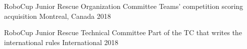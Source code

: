 
\begin{cvhonors}
\begin{comment}
  \cvhonor
    {RoboCup Junior Rescue Organization Committee} %
    {Design of competition fields, team interviews} %
    {Magdeburg, Germany} %
    {2017 - 2018} %
\end{comment}
  \cvhonor
    {RoboCup Junior Rescue Organization Committee} %
    {Teams' competition scoring acquisition} %
    {Montreal, Canada} %
    {2018} %

  \cvhonor
    {RoboCup Junior Rescue Technical Committee} %
    {Part of the TC that writes the international rules} %
    {International} %
    {2018} %


\end{cvhonors}

